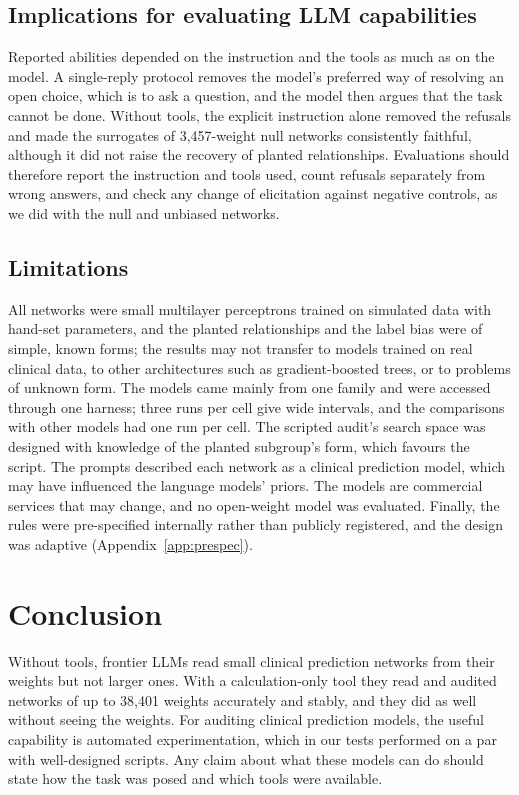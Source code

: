 \documentclass[11pt]{article}
\begin{document}
\subsection{Implications for evaluating LLM capabilities}

Reported abilities depended on the instruction and the tools as much as on the model. A single-reply protocol removes the model's preferred way of resolving an open choice, which is to ask a question, and the model then argues that the task cannot be done. Without tools, the explicit instruction alone removed the refusals and made the surrogates of 3,457-weight null networks consistently faithful, although it did not raise the recovery of planted relationships. Evaluations should therefore report the instruction and tools used, count refusals separately from wrong answers, and check any change of elicitation against negative controls, as we did with the null and unbiased networks.

\subsection{Limitations}

All networks were small multilayer perceptrons trained on simulated data with hand-set parameters, and the planted relationships and the label bias were of simple, known forms; the results may not transfer to models trained on real clinical data, to other architectures such as gradient-boosted trees, or to problems of unknown form. The models came mainly from one family and were accessed through one harness; three runs per cell give wide intervals, and the comparisons with other models had one run per cell. The scripted audit's search space was designed with knowledge of the planted subgroup's form, which favours the script. The prompts described each network as a clinical prediction model, which may have influenced the language models' priors. The models are commercial services that may change, and no open-weight model was evaluated. Finally, the rules were pre-specified internally rather than publicly registered, and the design was adaptive (Appendix~\ref{app:prespec}).

\section{Conclusion}

Without tools, frontier LLMs read small clinical prediction networks from their weights but not larger ones. With a calculation-only tool they read and audited networks of up to 38,401 weights accurately and stably, and they did as well without seeing the weights. For auditing clinical prediction models, the useful capability is automated experimentation, which in our tests performed on a par with well-designed scripts. Any claim about what these models can do should state how the task was posed and which tools were available.
\end{document}
